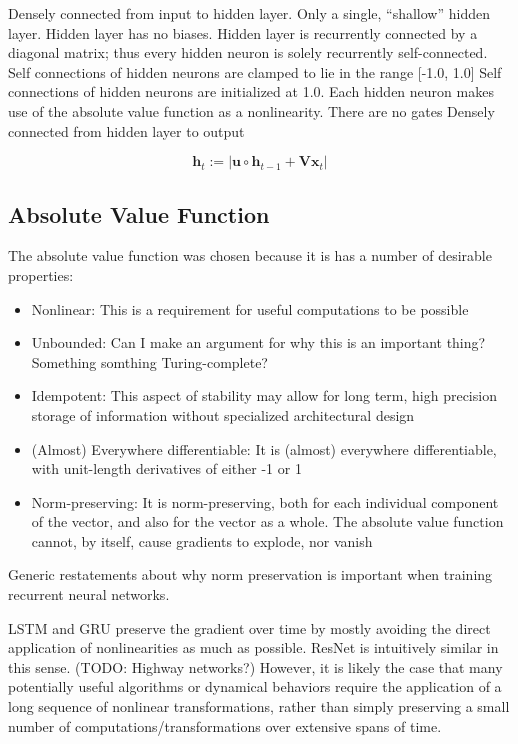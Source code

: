 \documentclass{article}
\begin{document}
Densely connected from input to hidden layer.
Only a single, “shallow” hidden layer.
Hidden layer has no biases.
Hidden layer is recurrently connected by a diagonal matrix; thus every hidden neuron is solely recurrently self-connected.
Self connections of hidden neurons are clamped to lie in the range [-1.0, 1.0]
Self connections of hidden neurons are initialized at 1.0.
Each hidden neuron makes use of the absolute value function as a nonlinearity.
There are no gates
Densely connected from hidden layer to output

\begin{equation}
  \mathbf{h}_t := | \mathbf{u} \circ \mathbf{h}_{t-1} + \mathbf{Vx}_t |
\end{equation}

\subsection{Absolute Value Function}

The absolute value function was chosen because it is has a number of desirable properties: 

\begin{itemize}
\item Nonlinear: This is a requirement for useful computations to be possible
\item Unbounded: Can I make an argument for why this is an important thing? Something somthing Turing-complete?
\item Idempotent: This aspect of stability may allow for long term, high precision storage of information without specialized architectural design
\item (Almost) Everywhere differentiable: It is (almost) everywhere differentiable, with unit-length derivatives of either -1 or 1
\item Norm-preserving: It is norm-preserving, both for each individual component of the vector, and also for the vector as a whole.
The absolute value function cannot, by itself, cause gradients to explode, nor vanish
\end{itemize}

Generic restatements about why norm preservation is important when training recurrent neural networks.

LSTM and GRU preserve the gradient over time by mostly avoiding the direct application of nonlinearities as much as possible. ResNet is intuitively similar in this sense. (TODO: Highway networks?) However, it is likely the case that many potentially useful algorithms or dynamical behaviors require the application of a long sequence of nonlinear transformations, rather than simply preserving a small number of computations/transformations over extensive spans of time.
\end{document}
